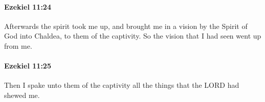 		\paragraph{Ezekiel 11:24} %
			\label{EZEKIEL-11-24}

			Afterwards the spirit took me up, and brought me in a vision by the Spirit of God into Chaldea, to them of the captivity. So the vision that I had seen went up from me.


		\paragraph{Ezekiel 11:25} %
			\label{EZEKIEL-11-25}

			Then I spake unto them of the captivity all the things that the LORD had shewed me.

